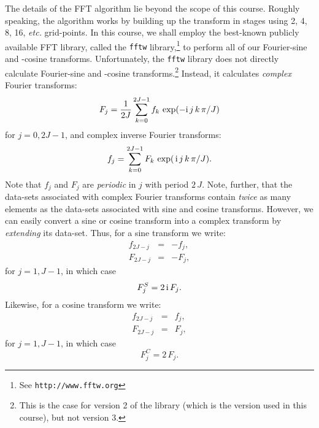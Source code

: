 The details of the FFT algorithm lie beyond the scope of this course. Roughly speaking,
the algorithm works by building up the transform in stages using 
2, 4, 8, 16, {\em etc.} grid-points. In this course, we shall employ the
best-known publicly available FFT library,
called the {\tt fftw} library,\footnote{See
{\tt http://www.fftw.org}} to perform all of our  Fourier-sine and -cosine transforms.  
Unfortunately, the {\tt fftw} library does not directly calculate Fourier-sine and
-cosine transforms.\footnote{This is the case for version 2 of the library (which is the version
used in this course), but not version 3.} Instead, it calculates {\em complex} Fourier transforms:
\begin{equation}
F_j = \frac{1}{2J}\sum_{k=0}^{2J-1} f_k\,\exp(-{\rm i}\,j\,k\,\pi/J)
\end{equation}
for $j=0,2J-1$, and complex inverse Fourier transforms:
\begin{equation}
f_j = \sum_{k=0}^{2J-1} F_k\,\exp(\,{\rm i}\,j\,k\,\pi/J).
\end{equation}
Note that $f_j$ and $F_j$ are {\em periodic} in $j$ with period $2\,J$. 
Note, further, that the data-sets associated with complex Fourier transforms contain {\em twice} as many
elements as the data-sets associated with sine and cosine transforms. 
However, we can easily convert a sine or cosine transform into a complex transform by {\em extending}
its data-set. Thus, for a sine transform we write:
\begin{eqnarray}
f_{2J-j} &=& - f_j,\\[0.5ex]
F_{2J-j} &=& -F_j,
\end{eqnarray}
for $j=1,J-1$, in which case
\begin{equation}
F_j^S = 2\,{\rm i}\,F_j.
\end{equation}
Likewise, for a cosine transform we write:
\begin{eqnarray}
f_{2J-j} &=& f_j,\\[0.5ex]
F_{2J-j} &=&F_j,
\end{eqnarray}
for $j=1,J-1$, in which case
\begin{equation}
F_j^C = 2\,F_j.
\end{equation}

